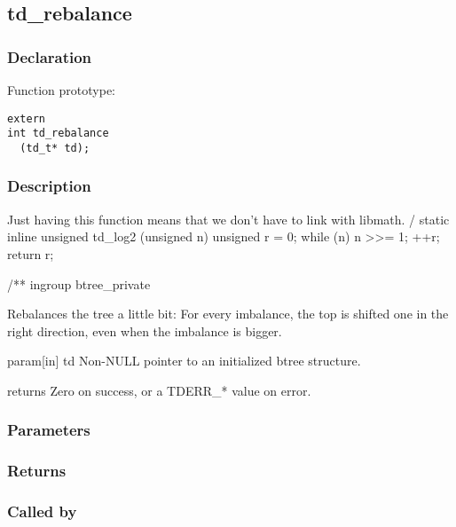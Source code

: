 
\newpage
\subsection{td\_rebalance}
\subsubsection{Declaration} Function prototype:

\begin{verbatim}
extern
int td_rebalance
  (td_t* td);
\end{verbatim}

\subsubsection{Description}


 Just having this function means that we don't have to link with libmath.
/
static inline
unsigned td\_log2
  (unsigned n)
{
  unsigned r = 0;
  while (n) {
    n >>= 1;
    ++r;
  }
  return r;
}

/**
 ingroup btree\_private

 Rebalances the tree a little bit:
 For every imbalance, the top is shifted one in the right direction,
 even when the imbalance is bigger.

 param[in] td Non-NULL pointer to an initialized btree structure.

 returns Zero on success, or a TDERR\_* value on error.
 

\subsubsection{Parameters}
\subsubsection{Returns}
\subsubsection{Called by}
